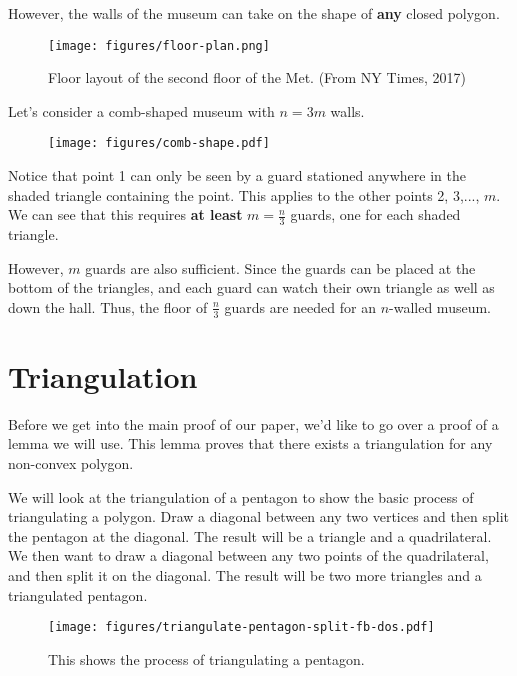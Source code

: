\documentclass[10pt]{amsart}
\begin{document}
However, the walls of the museum can take on the shape of {\bf any} closed polygon. 
\begin{figure}[h!]
    \centering
    \texttt{[image: figures/floor-plan.png]}
    \caption{Floor layout of the second floor of the Met. (From NY Times, 2017)}
\end{figure}

Let's consider a comb-shaped museum with $n = 3m$ walls.
\begin{figure}[h!]
    \centering
    \texttt{[image: figures/comb-shape.pdf]}
\end{figure}

Notice that point 1 can only be seen by a guard stationed anywhere in the shaded triangle containing the point. 
This applies to the other points 2, 3,..., $m$. 
We can see that this requires {\bf at least} $m = \frac{n}{3}$ guards, one for each shaded triangle. 

However, $m$ guards are also sufficient. 
Since the guards can be placed at the bottom of the triangles, and 
each guard can watch their own triangle as well as down the hall.
Thus, the floor of $\frac{n}{3}$ guards are needed for an $n$-walled museum.

\section{Triangulation}

Before we get into the main proof of our paper, we'd like to go over a proof of a lemma we will 
use. This lemma proves that there exists a triangulation for any non-convex polygon.

We will look at the triangulation of a pentagon to show the basic process of triangulating a polygon.
Draw a diagonal between any two vertices and then split the pentagon at the diagonal. The result will
be a triangle and a quadrilateral. We then want to draw a diagonal between any two points of the
quadrilateral, and then split it on the diagonal. The result will be two more triangles and a 
triangulated pentagon.
\begin{figure}[h!]
    \centering
    \texttt{[image: figures/triangulate-pentagon-split-fb-dos.pdf]}
    \caption{This shows the process of triangulating a pentagon.}
\end{figure}
\end{document}
